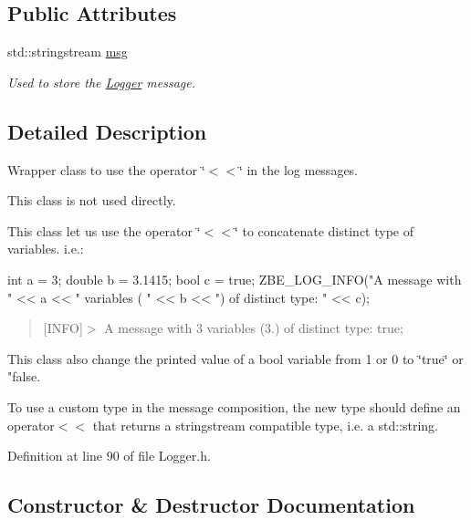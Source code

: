 \subsection*{Public Attributes}
\begin{DoxyCompactItemize}
\item 
std\+::stringstream \hyperlink{classzbe_1_1_logger_msg_a5829a582578494ec03debf9e574004cc}{msg}
\begin{DoxyCompactList}\small\item\em Used to store the \hyperlink{classzbe_1_1_logger}{Logger} message. \end{DoxyCompactList}\end{DoxyCompactItemize}


\subsection{Detailed Description}
Wrapper class to use the operator \char`\"{}$<$$<$\char`\"{} in the log messages. 

This class is not used directly.

This class let us use the operator \char`\"{}$<$$<$\char`\"{} to concatenate distinct type of variables. i.\+e.\+: \begin{DoxyVerb}  int a = 3;
  double b = 3.1415;
  bool c = true;
  ZBE_LOG_INFO("A message with " << a << " variables ( " << b << ") of distinct type: " << c);
\end{DoxyVerb}


\begin{quote}
\mbox{[}I\+N\+F\+O\mbox{]}$>$ A message with 3 variables (3.) of distinct type\+: true; \end{quote}


This class also change the printed value of a bool variable from 1 or 0 to \char`\"{}true\char`\"{} or "false.

To use a custom type in the message composition, the new type should define an operator$<$$<$ that returns a stringstream compatible type, i.\+e. a std\+::string. 

Definition at line 90 of file Logger.\+h.



\subsection{Constructor \& Destructor Documentation}
\hypertarget{classzbe_1_1_logger_msg_a6e2d3bd59184b8aef437dd8d73beefed}{}
